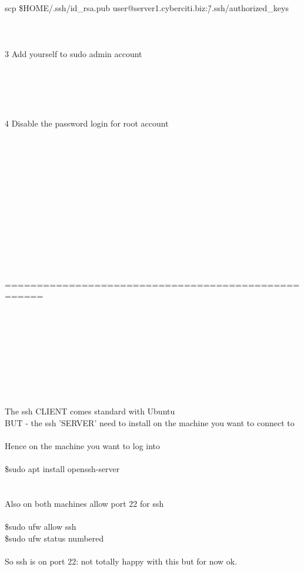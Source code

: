 \documentclass[10pt,a4paper]{article}
\begin{document}
{{{{{{{{{{{{{{{{{{{{{\\
scp \$HOME/.ssh/id\_rsa.pub user@server1.cyberciti.biz:\~/.ssh/authorized\_keys\\
\\
\\
\\
    3 Add yourself to sudo admin account\\
\\
\\
\\
\\
\\
    4 Disable the password login for root account\\
\\
\\
\\
\\
\\
\\
\\
\\
\\
\\
\\
\\
\\
====================================================\\
\\
\\
\\
\\
\\
\\
\\
{\large \\
\\
The ssh CLIENT comes standard with Ubuntu\\
BUT - the ssh 'SERVER' need to install on the machine you want to connect to\\
\\
Hence on the machine you want to log into\\
\\
				\$sudo apt install openssh-server\\
\\
\\
Also on both machines allow port 22 for ssh\\
\\
\$sudo ufw allow ssh\\
\$sudo ufw status numbered\\
\\
So ssh is on port 22: not totally happy with  this but for now ok.\\
}}}}}}}}}}}}}}}}}}}}}}
\end{document}
